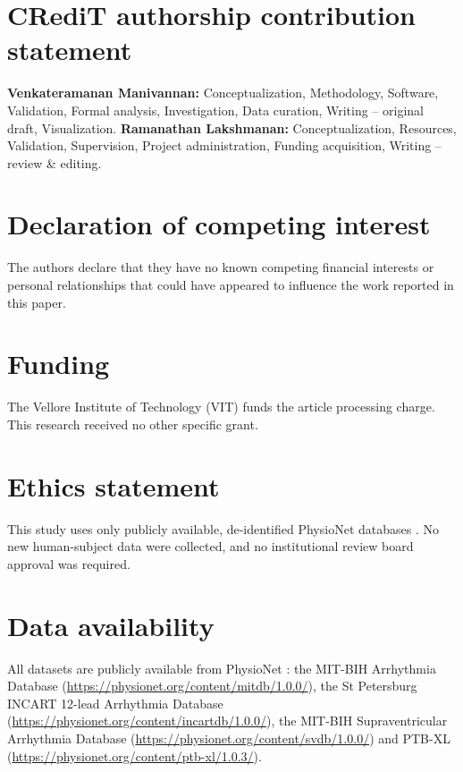 \documentclass[preprint,12pt]{elsarticle}
\begin{document}
\section*{CRediT authorship contribution statement}
\textbf{Venkateramanan Manivannan:} Conceptualization, Methodology, Software, Validation, Formal analysis, Investigation, Data curation, Writing -- original draft, Visualization. \textbf{Ramanathan Lakshmanan:} Conceptualization, Resources, Validation, Supervision, Project administration, Funding acquisition, Writing -- review \& editing.

\section*{Declaration of competing interest}
The authors declare that they have no known competing financial interests or personal relationships that could have appeared to influence the work reported in this paper.

\section*{Funding}
The Vellore Institute of Technology (VIT) funds the article processing charge. This research received no other specific grant.

\section*{Ethics statement}
This study uses only publicly available, de-identified PhysioNet databases \cite{goldberger_physiobank_2000, pollard_physionet_2026}. No new human-subject data were collected, and no institutional review board approval was required.

\section*{Data availability}
All datasets are publicly available from PhysioNet \cite{goldberger_physiobank_2000, pollard_physionet_2026}: the MIT-BIH Arrhythmia Database \cite{moody_impact_2001} (\url{https://physionet.org/content/mitdb/1.0.0/}), the St Petersburg INCART 12-lead Arrhythmia Database (\url{https://physionet.org/content/incartdb/1.0.0/}), the MIT-BIH Supraventricular Arrhythmia Database \cite{greenwald_improved_1990} (\url{https://physionet.org/content/svdb/1.0.0/}) and PTB-XL \cite{wagner_ptb-xl_2020} (\url{https://physionet.org/content/ptb-xl/1.0.3/}).
\end{document}

